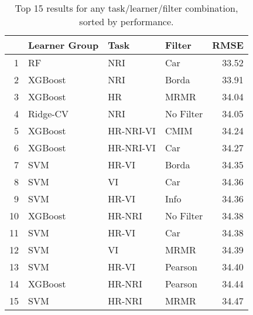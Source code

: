 \begin{table}[ht!]
\centering
\caption{Top 15 results for any task/learner/filter combination, sorted by performance.} 
\label{tab:perf-top-15}
\begin{tabular}{rlllr}
  \hline
 & Learner Group & Task & Filter & RMSE \\ 
  \hline
1 & RF & NRI & Car & 33.52 \\ 
  2 & XGBoost & NRI & Borda & 33.91 \\ 
  3 & XGBoost & HR & MRMR & 34.04 \\ 
  4 & Ridge-CV & NRI & No Filter & 34.05 \\ 
  5 & XGBoost & HR-NRI-VI & CMIM & 34.24 \\ 
  6 & XGBoost & HR-NRI-VI & Car & 34.27 \\ 
  7 & SVM & HR-VI & Borda & 34.35 \\ 
  8 & SVM & VI & Car & 34.36 \\ 
  9 & SVM & HR-VI & Info & 34.36 \\ 
  10 & XGBoost & HR-NRI & No Filter & 34.38 \\ 
  11 & SVM & HR-VI & Car & 34.38 \\ 
  12 & SVM & VI & MRMR & 34.39 \\ 
  13 & SVM & HR-VI & Pearson & 34.40 \\ 
  14 & XGBoost & HR-NRI & Pearson & 34.44 \\ 
  15 & SVM & HR-NRI & MRMR & 34.47 \\ 
   \hline
\end{tabular}
\end{table}
